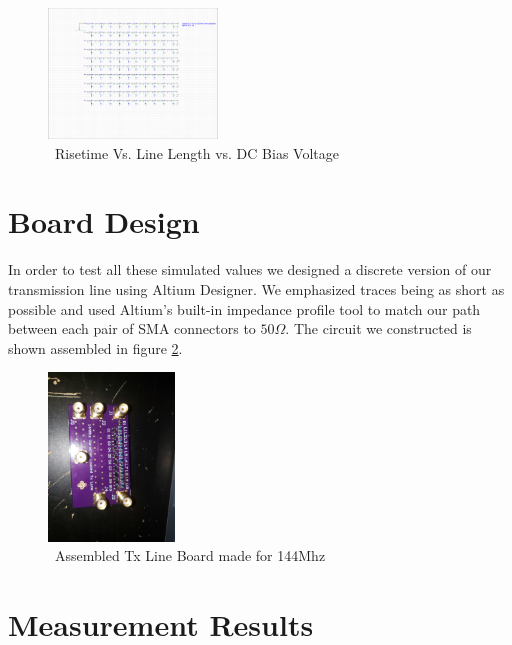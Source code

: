 \documentclass[journal]{IEEEtran} \usepackage[english]{babel}
\begin{document}
\begin{figure}[htb]
\centering
\includegraphics[width=0.4\textwidth,page = {3}]{RiseTimeVsDCBIASVsLength.pdf}
\caption{\ Risetime Vs. Line Length vs. DC Bias Voltage 
}\label{fig:RiseVsLineVsBias}
\end{figure}






\section{Board Design} 


In order to test all these simulated values we designed a discrete version of
our transmission line using Altium Designer. We emphasized traces being as short
as possible and used Altium's built-in impedance profile tool to match our path
between each pair of SMA connectors to $50\Omega$. The circuit we constructed is
shown assembled in figure \ref{fig:assembled}.


\begin{figure}[htb]
\centering
\includegraphics[width=0.3\textwidth, angle = 90]{AssembledBoard.jpg}
\caption{\ Assembled Tx Line Board made for 144Mhz
}\label{fig:assembled}
\end{figure}





\section{ Measurement Results }
\end{document}
